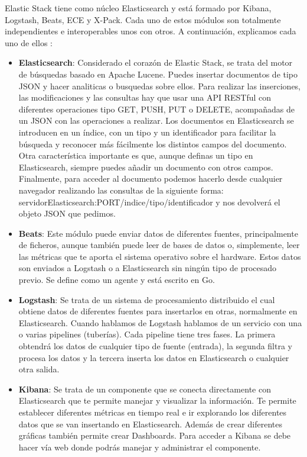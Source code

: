 Elastic Stack tiene como núcleo Elasticsearch y está formado por Kibana, Logstash, Beats, ECE y X-Pack. Cada uno de estos módulos son totalmente independientes e interoperables unos con otros. A continuación, explicamos cada uno de ellos \cite{Elk-4}:
\begin{itemize}
	\item \textbf{Elasticsearch}: Considerado el corazón de Elastic Stack, se trata del motor de búsquedas basado en Apache Lucene. Puedes insertar documentos de tipo JSON y hacer analiticas o busquedas sobre ellos. Para realizar las inserciones, las modificaciones y las consultas hay que usar una API RESTful con diferentes operaciones tipo GET, PUSH, PUT o DELETE, acompañadas de un JSON con las operaciones a realizar. Los documentos en Elasticsearch se introducen en un índice, con un tipo y un identificador para facilitar la búsqueda y reconocer más fácilmente los distintos campos del documento. Otra característica importante es que, aunque definas un tipo en Elasticsearch, siempre puedes añadir un documento con otros campos. Finalmente, para acceder al documento podemos hacerlo desde cualquier navegador realizando las consultas de la siguiente forma: servidorElasticsearch:PORT/indice/tipo/identificador y nos devolverá el objeto JSON que pedimos.
	\item \textbf{Beats}: Este módulo puede enviar datos de diferentes fuentes, principalmente de ficheros, aunque también puede leer de bases de datos o, simplemente, leer las métricas que te aporta el sistema operativo sobre el hardware. Estos datos son enviados a Logstash o a Elasticsearch sin ningún tipo de procesado previo. Se define como un agente y está escrito en Go.
	\item \textbf{Logstash}: Se trata de un sistema de procesamiento distribuido el cual obtiene datos de diferentes fuentes para insertarlos en otras, normalmente en Elasticsearch. Cuando hablamos de Logstash hablamos de un servicio con una o varias pipelines (tuberías). Cada pipeline tiene tres fases. La primera obtendrá los datos de cualquier tipo de fuente (entrada), la segunda filtra y procesa los datos y la tercera inserta los datos en Elasticsearch o cualquier otra salida.
	\item \textbf{Kibana}: Se trata de un componente que se conecta directamente con Elasticsearch que te permite manejar y visualizar la información. Te permite establecer diferentes métricas en tiempo real e ir explorando los diferentes datos que se van insertando en Elasticsearch. Además de crear diferentes gráficas también permite crear Dashboards. Para acceder a Kibana se debe hacer vía web donde podrás manejar y administrar el componente.

\end{itemize}
